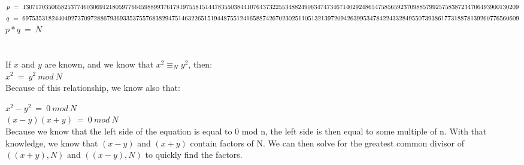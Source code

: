 \documentclass[10pt]{article}
\begin{document}
\noindent $p\ =\ 13071703506582537746030691218059776645988993761791975581514478\\
3550384410764373225534882490634747346714029248654758565923709885799257583872347\\
06493900130209$\\

\noindent $q\ =\ 69753531824404927370972886793693353755768382947514632265151944\\
8755124165887426702302511051321397209426399534784224332849550739386177318878139\\
260776560609$\\

$p*q\ =\ N$

\section{}
If $x$ and $y$ are known, and we know that $x^2 \equiv_N y^2$, then:\\

\noindent $x^2\ =\ y^2\ mod\ N$\\

Because of this relationship, we know also that:

\noindent $x^2-y^2\ =\ 0\ mod\ N$\\
$(x-y)(x+y)\ =\ 0\ mod\ N$\\

Because we know that the left side of the equation is equal to 0 mod n, the
left side is then equal to some multiple of n. With that knowledge, we know that
$(x-y)$ and $(x+y)$ contain factors of N. We can then solve for the greatest
common divisor of $((x+y),N)$ and $((x-y),N)$ to quickly find the factors. 
\end{document}

